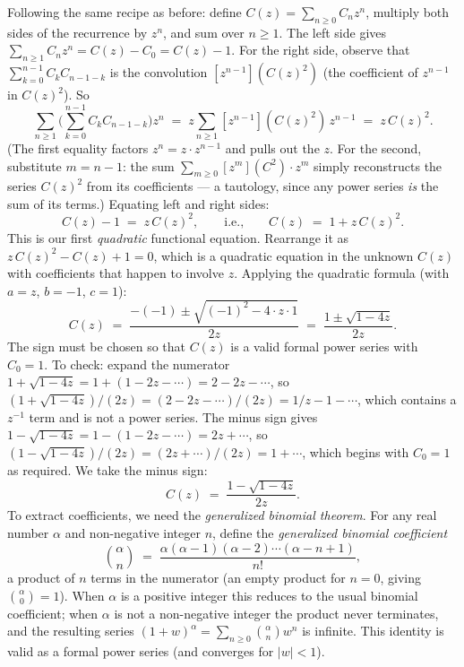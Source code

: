 Following the same recipe as before: define $C(z) = \sum_{n \ge 0} C_n z^n$, multiply both sides of the recurrence by $z^n$, and sum over $n \ge 1$. The left side gives $\sum_{n \ge 1} C_n z^n = C(z) - C_0 = C(z) - 1$. For the right side, observe that $\sum_{k=0}^{n-1} C_k C_{n-1-k}$ is the convolution $[z^{n-1}](C(z)^2)$ (the coefficient of $z^{n-1}$ in $C(z)^2$). So
\[
  \sum_{n \ge 1}\biggl(\sum_{k=0}^{n-1} C_k C_{n-1-k}\biggr) z^n
  \;=\; z \sum_{n \ge 1} [z^{n-1}](C(z)^2)\, z^{n-1}
  \;=\; z\, C(z)^2.
\]
(The first equality factors $z^n = z \cdot z^{n-1}$ and pulls out the $z$. For the second, substitute $m = n-1$: the sum $\sum_{m \ge 0} [z^m](C^2)\cdot z^m$ simply reconstructs the series $C(z)^2$ from its coefficients --- a tautology, since any power series \emph{is} the sum of its terms.) Equating left and right sides:
\[
  C(z) - 1 \;=\; z\, C(z)^2, \qquad\text{i.e.,}\qquad C(z) \;=\; 1 + z\, C(z)^2.
\]
This is our first \emph{quadratic} functional equation. Rearrange it as $z\,C(z)^2 - C(z) + 1 = 0$, which is a quadratic equation in the unknown $C(z)$ with coefficients that happen to involve $z$. Applying the quadratic formula (with $a = z$, $b = -1$, $c = 1$):
\[
  C(z) \;=\; \frac{-(-1) \pm \sqrt{(-1)^2 - 4 \cdot z \cdot 1}}{2z} \;=\; \frac{1 \pm \sqrt{1 - 4z}}{2z}.
\]
The sign must be chosen so that $C(z)$ is a valid formal power series with $C_0 = 1$. To check: expand the numerator $1 + \sqrt{1-4z} = 1 + (1 - 2z - \cdots) = 2 - 2z - \cdots$, so $(1+\sqrt{1-4z})/(2z) = (2-2z-\cdots)/(2z) = 1/z - 1 - \cdots$, which contains a $z^{-1}$ term and is not a power series. The minus sign gives $1 - \sqrt{1-4z} = 1 - (1 - 2z - \cdots) = 2z + \cdots$, so $(1-\sqrt{1-4z})/(2z) = (2z + \cdots)/(2z) = 1 + \cdots$, which begins with $C_0 = 1$ as required. We take the minus sign:
\[
  C(z) \;=\; \frac{1 - \sqrt{1 - 4z}}{2z}.
\]
To extract coefficients, we need the \emph{generalized binomial theorem}. For any real number $\alpha$ and non-negative integer $n$, define the \emph{generalized binomial coefficient}
\[
  \binom{\alpha}{n} \;=\; \frac{\alpha(\alpha-1)(\alpha-2)\cdots(\alpha-n+1)}{n!},
\]
a product of $n$ terms in the numerator (an empty product for $n=0$, giving $\binom{\alpha}{0}=1$). When $\alpha$ is a positive integer this reduces to the usual binomial coefficient; when $\alpha$ is not a non-negative integer the product never terminates, and the resulting series $(1+w)^\alpha = \sum_{n \ge 0}\binom{\alpha}{n}w^n$ is infinite. This identity is valid as a formal power series (and converges for $|w|<1$).

